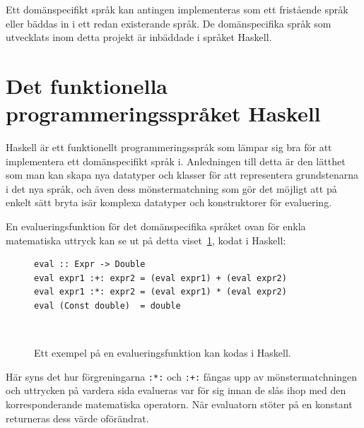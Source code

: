 \begin{draft}
Ett domänspecifikt språk kan antingen implementeras som ett fristående språk eller bäddas in i ett redan existerande språk. De domänspecifika språk som   utvecklats inom detta projekt är inbäddade i språket Haskell.
\end{draft}

\section{Det funktionella programmeringsspråket Haskell}

\begin{draft}
  Haskell är ett funktionellt programmeringsspråk som lämpar sig bra för att
  implementera ett domänspecifikt språk i. Anledningen till detta är den lätthet
  som man kan skapa nya datatyper och klasser för att representera grundstenarna
  i det nya språk, och även dess mönstermatchning som gör det möjligt att på
  enkelt sätt bryta isär komplexa datatyper och konstruktorer för evaluering.

  En evalueringsfunktion för det domänspecifika språket ovan för enkla
  matematiska uttryck kan se ut på detta viset~\ref{fig:eval_exempel}, kodat i
  Haskell:

  \begin{figure}[tph]
  \begin{lstlisting}
eval :: Expr -> Double
eval expr1 :+: expr2 = (eval expr1) + (eval expr2)
eval expr1 :*: expr2 = (eval expr1) * (eval expr2)
eval (Const double)  = double
  \end{lstlisting}
  \caption{Ett exempel på en evalueringsfunktion kan kodas i
Haskell.}~\label{fig:eval_exempel} \end{figure}

Här syns det hur förgreningarna \texttt{:*:} och \texttt{:+:} fångas upp av
mönstermatchningen och uttrycken på vardera sida evalueras var för sig innan de
slås ihop med den korresponderande matematiska operatorn. När evaluatorn stöter
på en konstant returneras dess värde oförändrat. 

\end{draft}

